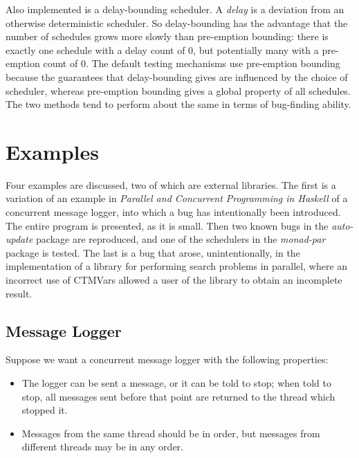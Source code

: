 Also implemented is a delay-bounding scheduler. A \textit{delay} is a
deviation from an otherwise deterministic scheduler. So delay-bounding
has the advantage that the number of schedules grows more slowly than
pre-emption bounding: there is exactly one schedule with a delay count
of 0, but potentially many with a pre-emption count of 0. The default
testing mechanisms use pre-emption bounding because the guarantees
that delay-bounding gives are influenced by the choice of scheduler,
whereas pre-emption bounding gives a global property of all
schedules. The two methods tend to perform about the same in terms of
bug-finding ability\cite{empirical}.

\section{Examples}
\label{sec:dejafu-example}

Four examples are discussed, two of which are external libraries. The
first is a variation of an example in \textit{Parallel and Concurrent
  Programming in Haskell}\cite{parconc} of a concurrent message
logger, into which a bug has intentionally been introduced. The entire
program is presented, as it is small. Then two known bugs in the
\textit{auto-update} package are reproduced, and one of the schedulers
in the \textit{monad-par} package is tested. The last is a bug that
arose, unintentionally, in the implementation of a library for
performing search problems in parallel, where an incorrect use of
CTMVars allowed a user of the library to obtain an incomplete result.

\subsection*{Message Logger}
\label{sec:dejafu-example-logger}

Suppose we want a concurrent message logger with the following
properties:

\begin{itemize}
  \item The logger can be sent a message, or it can be told to stop;
    when told to stop, all messages sent before that point are
    returned to the thread which stopped it.

  \item Messages from the same thread should be in order, but messages
    from different threads may be in any order.
\end{itemize}

